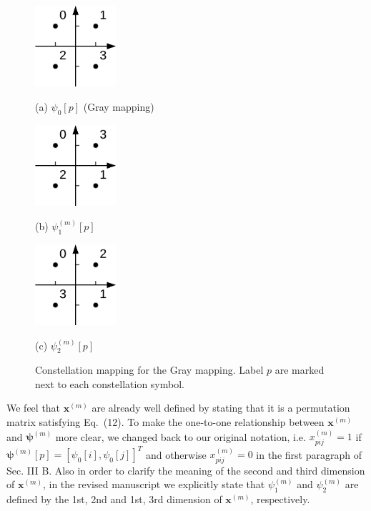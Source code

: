 \documentclass[onecolumn, 11pt, draftclsnofoot]{IEEEtran}
\begin{document}
\begin{figure}[h]
  \begin{minipage}[b]{0.32\linewidth}
    \centering
    \centerline{\includegraphics[width=3.0cm]{./figs/gray.pdf}}
    \centerline{(a) $\psi_0[p]$ (Gray mapping)}
    \medskip
  \end{minipage}
  \hfill
  \begin{minipage}[b]{.32\linewidth}
    \centering
    \centerline{\includegraphics[width=3.0cm]{./figs/tx1.pdf}}
    \centerline{(b) $\psi_1^{(m)}[p]$}
    \medskip
  \end{minipage}
  \hfill
  \begin{minipage}[b]{.32\linewidth}
    \centering
    \centerline{\includegraphics[width=3.0cm]{./figs/tx2.pdf}}
    \centerline{(c) $\psi_2^{(m)}[p]$}
    \medskip
  \end{minipage}
  \caption{Constellation mapping for the Gray mapping. Label $p$
  are marked next to each constellation symbol.}
  \label{fig:mapping}
\end{figure}

We feel that $\mathbf{x}^{(m)}$ are already well defined by stating that
it is a permutation matrix satisfying Eq.~(12). To make the one-to-one
relationship between $\mathbf{x}^{(m)}$ and $\bm{\psi}^{(m)}$ more clear, we
changed back to our original notation, i.e. $x_{pij}^{(m)}
= 1$ if $ \bm{\psi}^{(m)}[p] = [\psi_0[i], \psi_0[j]]^T$ and otherwise $x_{pij}^{(m)} =
0$ in the first paragraph of Sec. III B. Also in order to clarify the meaning of
the second and third dimension of $\mathbf{x}^{(m)}$, in the revised manuscript
we explicitly state that $\psi_1^{(m)}$ and $\psi_2^{(m)}$ are defined by the
1st, 2nd and 1st, 3rd dimension of $\mathbf{x}^{(m)}$, respectively.
\end{document}
